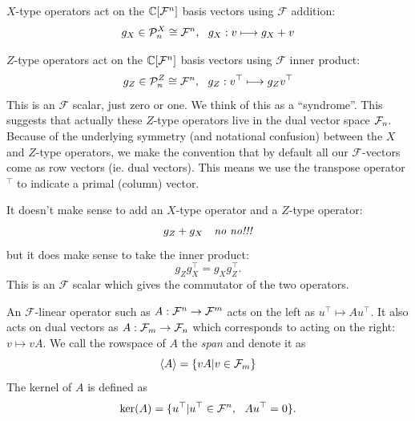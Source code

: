 \documentclass[12pt]{article}
\newcommand{\Field}{\mathcal{F}}
\def\Ker{\mathrm{ker}}
\begin{document}
$X$-type operators act on the $\Complex[\Fn]$
basis vectors using $\Field$ addition:
$$
    g_X \in \Pauli^X_n \cong \Fn, \ \ g_X : v \longmapsto g_X + v
$$

$Z$-type operators act on the
$\Complex[\Fn]$ basis vectors using $\Field$ inner product:
$$
    g_Z \in \Pauli^Z_n \cong \Fn, \ \ g_Z : v^\top \longmapsto g_Z v^\top
$$
This is an $\Field$ scalar, just zero or one. We think of this
as a ``syndrome''.
This suggests that actually these $Z$-type operators
live in the dual vector space $\Fnd.$
Because of the underlying symmetry
(and notational confusion)
between the $X$ and $Z$-type operators,
we make the convention that by default
all our $\Field$-vectors come as row vectors (ie. dual vectors).
This means we use the transpose operator $^\top$ to
indicate a primal (column) vector.

It doesn't make sense to add an $X$-type operator and
a $Z$-type operator:
$$
    g_Z + g_X \ \ \ \mbox{\emph{no no!!!}}
$$
but it does make sense to take the inner product:
$$
    g_Z g_X^\top = g_X g_Z^\top.
$$
This is an $\Field$ scalar which gives the commutator of the 
two operators.

An $\Field$-linear operator such as
$ A : \Fn \to \Fm $
acts on the left as $ u^\top \mapsto A u^\top.$
It also acts on dual vectors as
$ A : \Fmd \to \Fnd $
which corresponds to acting on the right: $v \mapsto vA.$ 
We call the rowspace of 
$A$ the \emph{span} and denote 
it as 
$$\Span{A} = \{ vA | v \in \Fmd \}$$
The kernel of $A$ is defined as
$$
    \Ker(A) = \{ u^\top | u^\top \in \Fn,\ \  A u^\top = 0 \}.
$$
\end{document}
